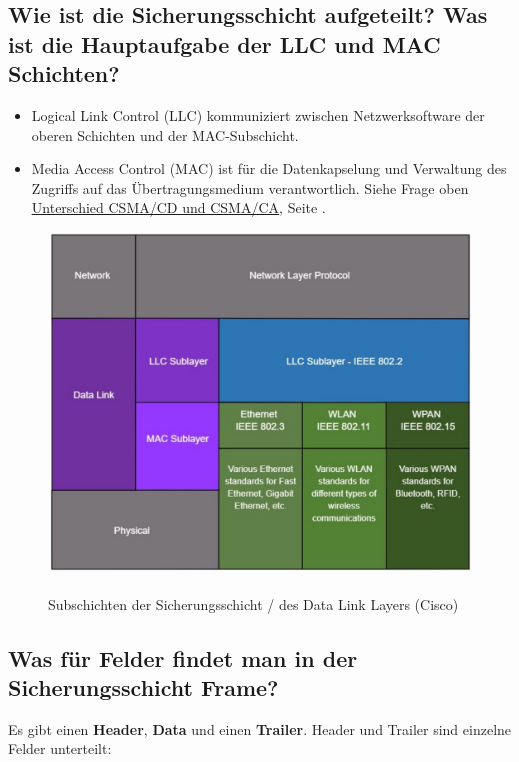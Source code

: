 \pagebreak
\subsection*{Wie ist die Sicherungsschicht aufgeteilt? Was ist die Hauptaufgabe der LLC und MAC Schichten?}\label{sub:LLC_MAC}
\begin{itemize}
    \item Logical Link Control (LLC) kommuniziert zwischen Netzwerksoftware der oberen Schichten und der MAC-Subschicht.
    \item Media Access Control (MAC) ist für die Datenkapselung und Verwaltung des Zugriffs auf das Übertragungsmedium verantwortlich. Siehe Frage oben \underline{\hyperref[sub:csma]{Unterschied CSMA/CD und CSMA/CA}}, Seite \pageref{sub:csma}.
\end{itemize}

\begin{figure}[H]
    \begin{center}
    \label{pic:DataLinkLayer_LLC_MAC}
    \includegraphics[width=\textwidth]{images/DLL_Sublayers.jpg}
    \caption{Subschichten der Sicherungsschicht / des Data Link Layers (\textsuperscript{\textcopyright}Cisco)}
    \end{center}
\end{figure}

\subsection*{Was für Felder findet man in der Sicherungsschicht Frame?}
Es gibt einen \textbf{Header}, \textbf{Data} und einen \textbf{Trailer}. Header und Trailer sind einzelne Felder unterteilt:

